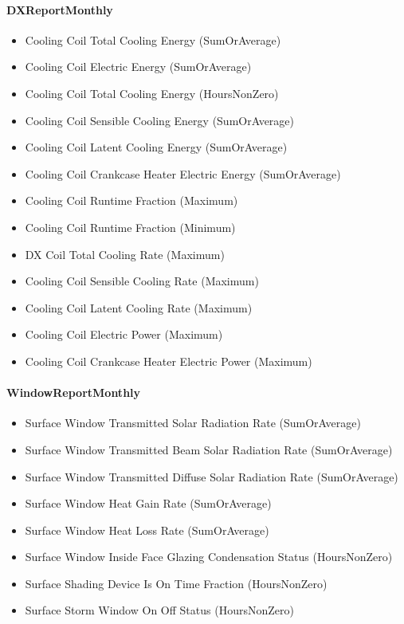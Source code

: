 \paragraph{DXReportMonthly}\label{dxreportmonthly}

\begin{itemize}
\item
  Cooling Coil Total Cooling Energy (SumOrAverage)
\item
  Cooling Coil Electric Energy (SumOrAverage)
\item
  Cooling Coil Total Cooling Energy (HoursNonZero)
\item
  Cooling Coil Sensible Cooling Energy (SumOrAverage)
\item
  Cooling Coil Latent Cooling Energy (SumOrAverage)
\item
  Cooling Coil Crankcase Heater Electric Energy (SumOrAverage)
\item
  Cooling Coil Runtime Fraction (Maximum)
\item
  Cooling Coil Runtime Fraction (Minimum)
\item
  DX Coil Total Cooling Rate (Maximum)
\item
  Cooling Coil Sensible Cooling Rate (Maximum)
\item
  Cooling Coil Latent Cooling Rate (Maximum)
\item
  Cooling Coil Electric Power (Maximum)
\item
  Cooling Coil Crankcase Heater Electric Power (Maximum)
\end{itemize}

\paragraph{WindowReportMonthly}\label{windowreportmonthly}

\begin{itemize}
\item
  Surface Window Transmitted Solar Radiation Rate (SumOrAverage)
\item
  Surface Window Transmitted Beam Solar Radiation Rate (SumOrAverage)
\item
  Surface Window Transmitted Diffuse Solar Radiation Rate (SumOrAverage)
\item
  Surface Window Heat Gain Rate (SumOrAverage)
\item
  Surface Window Heat Loss Rate (SumOrAverage)
\item
  Surface Window Inside Face Glazing Condensation Status (HoursNonZero)
\item
  Surface Shading Device Is On Time Fraction (HoursNonZero)
\item
  Surface Storm Window On Off Status (HoursNonZero)
\end{itemize}

